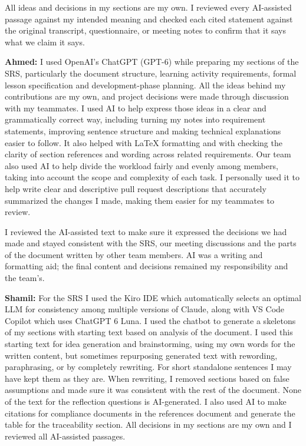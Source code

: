 \documentclass[12pt]{article}
\renewcommand{\_}{\textunderscore\allowbreak}%
\begin{document}
All ideas and decisions in my sections are my own. I reviewed every AI-assisted
passage against my intended meaning and checked each cited statement against the
original transcript, questionnaire, or meeting notes to confirm that it says
what we claim it says.

\textbf{Ahmed:} I used OpenAI's ChatGPT (GPT-6) while preparing my sections of
the SRS, particularly the document structure, learning activity requirements,
formal lesson specification and development-phase planning. All the ideas behind
my contributions are my own, and project decisions were made through discussion
with my teammates. I used AI to help express those ideas in a clear and
grammatically correct way, including turning my notes into requirement
statements, improving sentence structure and making technical explanations
easier to follow. It also helped with \LaTeX{} formatting and with checking the
clarity of section references and wording across related requirements. Our team
also used AI to help divide the workload fairly and evenly among members, taking
into account the scope and complexity of each task. I personally used it to help
write clear and descriptive pull request descriptions that accurately summarized
the changes I made, making them easier for my teammates to review.

I reviewed the AI-assisted text to make sure it expressed the decisions we had
made and stayed consistent with the SRS, our meeting discussions and the parts
of the document written by other team members. AI was a writing and formatting
aid; the final content and decisions remained my responsibility and the team's.

\textbf{Shamil:} For the SRS I used the Kiro IDE which automatically selects an
optimal LLM for consistency among multiple versions of Claude, along with VS
Code Copilot which uses ChatGPT 6 Luna. I used the chatbot to generate a
skeletons of my sections with starting text based on analysis of the document. I
used this starting text for idea generation and brainstorming, using my own
words for the written content, but sometimes repurposing generated text with
rewording, paraphrasing, or by completely rewriting. For short standalone
sentences I may have kept them as they are. When rewriting, I removed sections
based on false assumptions and made sure it was consistent with the rest of the
document. None of the text for the reflection questions is AI-generated. I also
used AI to make citations for compliance documents in the references document
and generate the table for the traceability section. All decisions in my
sections are my own and I reviewed all AI-assisted passages.
\end{document}
